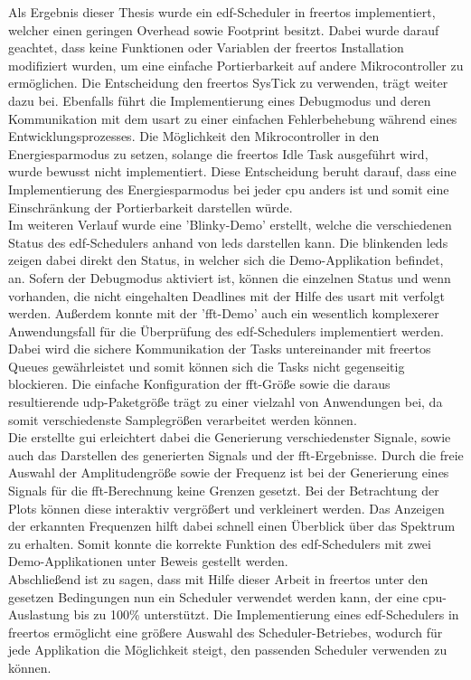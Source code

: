 \documentclass[../EDF Master Thesis.tex]{subfiles}
\begin{document}
    Als Ergebnis dieser Thesis wurde ein \ac{edf}-Scheduler in \ac{freertos} implementiert, welcher einen geringen Overhead sowie Footprint besitzt.
    Dabei wurde darauf geachtet, dass keine Funktionen oder Variablen der \ac{freertos} Installation modifiziert wurden, um eine einfache Portierbarkeit auf andere Mikrocontroller zu ermöglichen.
    Die Entscheidung den \ac{freertos} SysTick zu verwenden, trägt weiter dazu bei.
    Ebenfalls führt die Implementierung eines Debugmodus und deren Kommunikation mit dem \ac{usart} zu einer einfachen Fehlerbehebung während eines Entwicklungsprozesses.
    Die Möglichkeit den Mikrocontroller in den Energiesparmodus zu setzen, solange die \ac{freertos} Idle Task ausgeführt wird, wurde bewusst nicht implementiert.
    Diese Entscheidung beruht darauf, dass eine Implementierung des Energiesparmodus bei jeder \ac{cpu} anders ist und somit eine Einschränkung der Portierbarkeit darstellen würde.\\
    Im weiteren Verlauf wurde eine 'Blinky-Demo' erstellt, welche die verschiedenen Status des \ac{edf}-Schedulers anhand von \ac{led}s darstellen kann.
    Die blinkenden \ac{led}s zeigen dabei direkt den Status, in welcher sich die Demo-Applikation befindet, an.
    Sofern der Debugmodus aktiviert ist, können die einzelnen Status und wenn vorhanden, die nicht eingehalten Deadlines mit der Hilfe des \ac{usart} mit verfolgt werden.
    Außerdem konnte mit der '\ac{fft}-Demo' auch ein wesentlich komplexerer Anwendungsfall für die Überprüfung des \ac{edf}-Schedulers implementiert werden.
    Dabei wird die sichere Kommunikation der Tasks untereinander mit \ac{freertos} Queues gewährleistet und somit können sich die Tasks nicht gegenseitig blockieren.
    Die einfache Konfiguration der \ac{fft}-Größe sowie die daraus resultierende \ac{udp}-Paketgröße trägt zu einer vielzahl von Anwendungen bei, da somit verschiedenste Samplegrößen verarbeitet werden können.\\
    Die erstellte \ac{gui} erleichtert dabei die Generierung verschiedenster Signale, sowie auch das Darstellen des generierten Signals und der \ac{fft}-Ergebnisse.
    Durch die freie Auswahl der Amplitudengröße sowie der Frequenz ist bei der Generierung eines Signals für die \ac{fft}-Berechnung keine Grenzen gesetzt.
    Bei der Betrachtung der Plots können diese interaktiv vergrößert und verkleinert werden.
    Das Anzeigen der erkannten Frequenzen hilft dabei schnell einen Überblick über das Spektrum zu erhalten.
    Somit konnte die korrekte Funktion des \ac{edf}-Schedulers mit zwei Demo-Applikationen unter Beweis gestellt werden.\\
    Abschließend ist zu sagen, dass mit Hilfe dieser Arbeit in \ac{freertos} unter den gesetzen Bedingungen nun ein Scheduler verwendet werden kann, der eine \ac{cpu}-Auslastung bis zu 100\% unterstützt.
    Die Implementierung eines \ac{edf}-Schedulers in \\\ac{freertos} ermöglicht eine größere Auswahl des Scheduler-Betriebes, wodurch für jede Applikation die Möglichkeit steigt, den passenden Scheduler verwenden zu können.
\end{document}
